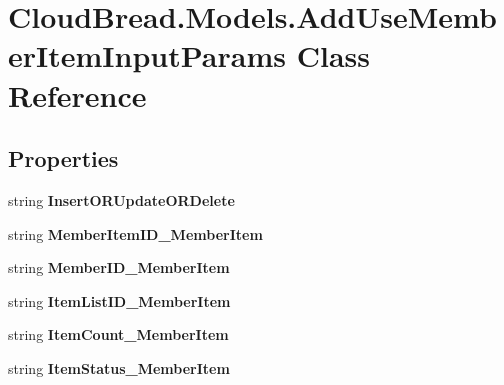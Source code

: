 \hypertarget{a00005}{}\section{Cloud\+Bread.\+Models.\+Add\+Use\+Member\+Item\+Input\+Params Class Reference}
\label{a00005}
\subsection*{Properties}
\begin{DoxyCompactItemize}
\item 
string {\bfseries Insert\+O\+R\+Update\+O\+R\+Delete}\hypertarget{a00005_a400c60db2de4d90c7858a9f40e501c7c}{}\label{a00005_a400c60db2de4d90c7858a9f40e501c7c}

\item 
string {\bfseries Member\+Item\+I\+D\+\_\+\+Member\+Item}\hypertarget{a00005_a8def127355d10c07fbe7a22650dbbca8}{}\label{a00005_a8def127355d10c07fbe7a22650dbbca8}

\item 
string {\bfseries Member\+I\+D\+\_\+\+Member\+Item}\hypertarget{a00005_a559753f4de2605b929ea464a4c5505ec}{}\label{a00005_a559753f4de2605b929ea464a4c5505ec}

\item 
string {\bfseries Item\+List\+I\+D\+\_\+\+Member\+Item}\hypertarget{a00005_a03905265e151b7c2a65f684709ce8581}{}\label{a00005_a03905265e151b7c2a65f684709ce8581}

\item 
string {\bfseries Item\+Count\+\_\+\+Member\+Item}\hypertarget{a00005_afa7f5061df08e7f18d483cfec7d782c0}{}\label{a00005_afa7f5061df08e7f18d483cfec7d782c0}

\item 
string {\bfseries Item\+Status\+\_\+\+Member\+Item}\hypertarget{a00005_a3c73c8ce21bf032ec07ceb6c66fb5ce5}{}\label{a00005_a3c73c8ce21bf032ec07ceb6c66fb5ce5}


\end{DoxyCompactItemize}
